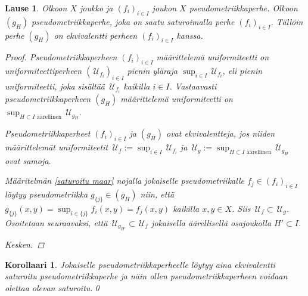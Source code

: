 \documentclass[12pt,a4paper,leqno]{report}
\newcommand{\U}{\,\mathcal{U}}
\theoremstyle{plain}
\newtheorem{lause}[equation]{Lause}
\newtheorem{kor}[equation]{Korollaari}
\theoremstyle{definition}
\theoremstyle{remark}
\begin{document}
\begin{lause}
Olkoon $X$ joukko ja $(f_i)_{i\in I} $ joukon $X$ pseudometriikkaperhe. 
Olkoon $(g_H) $ pseudometriikkaperhe, 
joka on saatu saturoimalla perhe $(f_i)_{i\in I} $. 
Tällöin perhe $(g_H) $ on ekvivalentti 
perheen $(f_i)_{i\in I}$ kanssa.
\begin{proof}
Pseudometriikkaperheen $(f_i)_{i\in I}$ määrittelemä uniformiteetti on 
uniformiteettiperheen $(\U_{f_i})_{i\in I}$ pienin yläraja $\sup_{i\in I}\U_{f_i}$, 
eli pienin uniformiteetti, 
joka sisältää $\U_{f_i}$ kaikilla $i\in I$. 
Vastaavasti pseudometriikkaperheen $(g_H)$ määrittelemä 
uniformiteetti on $\sup_{H\subset I\text{ äärellinen}}\U_{g_H}$. 

Pseudometriikkaperheet $(f_i)_{i\in I}$ ja $(g_H)$ 
ovat ekvivalentteja, 
jos niiden määrittelemät uniformiteetit 
$\U_f:=\sup_{i\in I}\U_{f_i}$ ja 
$\U_g:=\sup_{H\subset I\text{ äärellinen}}\U_{g_H}$ 
ovat samoja. 

Määritelmän \ref{saturoitu maar} nojalla 
jokaiselle pseudometriikalle $f_j\in(f_i)_{i\in I}$ löytyy 
pseudometriikka $g_{\{j\}}\in (g_H)$ niin, 
että $g_{\{j\}}(x,y)=\sup_{i\in\{j\}}f_i(x,y)=f_j(x,y)$ 
kaikilla $x,y\in X$. 
Siis $\U_f\subset\U_g$. 
%
%
Osoitetaan seuraavaksi, että 
$\U_{g_{H'}}\subset\U_{f}$ 
jokaisella äärellisellä osajoukolla $H'\subset I$. 



Kesken.
\end{proof}
\end{lause}
\begin{kor}\label{saturoitu oletus}
Jokaiselle pseudometriikkaperheelle löytyy aina ekvivalentti saturoitu pseudometriikkaperhe 
ja näin ollen pseudometriikkaperheen voidaan olettaa olevan saturoitu.\qed
\end{kor}
\end{document}
